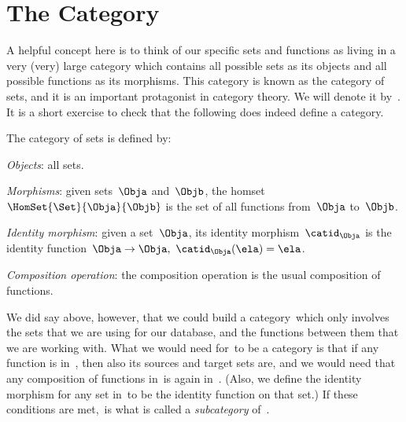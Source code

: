 

\section{The Category \Set}

A helpful concept here is to think of our specific sets and functions as living in a very (very) large category which contains all possible sets as its objects and all possible functions as its morphisms. This category is known as the category of sets, and it is an important protagonist in category theory. We will denote it by~\Set. It is a short exercise to check that the following does indeed define a category.

\begin{ctdefinition}
  \label{def:Set}
  The category of sets \iindex{\Set} is defined by:
  \begin{compactenum}
    \item \emph{Objects}: all sets.
    \item \emph{Morphisms}: given sets~$\Obja$ and~$\Objb$, the homset~$\HomSet{\Set}{\Obja}{\Objb}$ is the set of all functions from~$\Obja$ to~$\Objb$.
    \item \emph{Identity morphism}: given a set~$\Obja$, its identity morphism~$\catid_\Obja$ is the identity function~$\Obja \to \Obja, \ \catid_\Obja(\ela) = \ela$.
    \item \emph{Composition operation}: the composition operation is the usual composition of functions.
  \end{compactenum}
\end{ctdefinition}

We did say above, however, that we could build a category~\Database which only involves the sets that we are using for our database, and the functions between them that we are working with. What we would need for~\Database to be a category is that if any function is in~\Database, then also its sources and target sets are, and we would need that any composition of functions in~\Database is again in~\Database. (Also, we define the identity morphism for any set in~\Database to be the identity function on that set.) If these conditions are met,~\Database is what is called a \emph{subcategory} of~\Set.